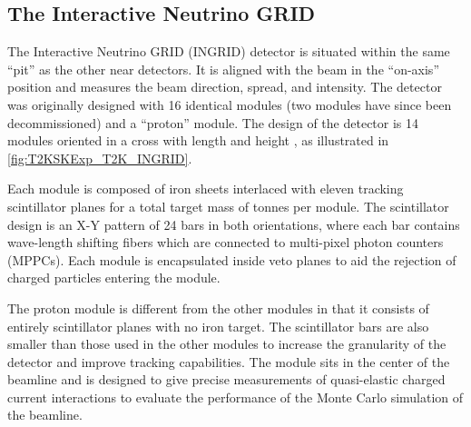 \subsection{The Interactive Neutrino GRID}
\label{subsec:T2KSKExp_T2K_INGRID}

The Interactive Neutrino GRID (INGRID) detector is situated within the same ``pit'' as the other near detectors. It is aligned with the beam in the ``on-axis'' position and measures the beam direction, spread, and intensity. The detector was originally designed with 16 identical modules \cite{t2k_det} (two modules have since been decommissioned) and a ``proton'' module. The design of the detector is 14 modules oriented in a cross with length and height , as illustrated in \autoref{fig:T2KSKExp_T2K_INGRID}.

Each module is composed of iron sheets interlaced with eleven tracking scintillator planes for a total target mass of  tonnes per module. The scintillator design is an X-Y pattern of 24 bars in both orientations, where each bar contains wave-length shifting fibers which are connected to multi-pixel photon counters (MPPCs). Each module is encapsulated inside veto planes to aid the rejection of charged particles entering the module.

The proton module is different from the other modules in that it consists of entirely scintillator planes with no iron target. The scintillator bars are also smaller than those used in the other modules to increase the granularity of the detector and improve tracking capabilities. The module sits in the center of the beamline and is designed to give precise measurements of quasi-elastic charged current interactions to evaluate the performance of the Monte Carlo simulation of the beamline. 

